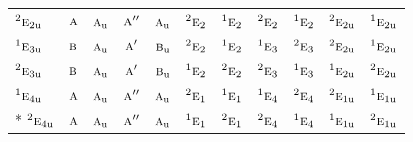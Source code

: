\documentclass[10pt,a4paper]{article}
\numberwithin{equation}{section}
\newcommand{\irr}[1]{\text{\normalfont\scshape #1}}
\newcommand{\conjpair}[1]{{}^{#1}}
\newcommand{\ptag}[1]{\mathrm{#1}}
\begin{document}
{\begin{longtable}{@{}lcccccccccc@{}}
$\conjpair{2}\irr{e}_{2\ptag{u}}$ & $\irr{a}$ & $\irr{a}_{\ptag{u}}$ & $\irr{a}''$ & $\irr{a}_{\ptag{u}}$ & $\conjpair{2}\irr{e}_{2}$ & $\conjpair{1}\irr{e}_{2}$ & $\conjpair{2}\irr{e}_{2}$ & $\conjpair{1}\irr{e}_{2}$ & $\conjpair{2}\irr{e}_{2\ptag{u}}$ & $\conjpair{1}\irr{e}_{2\ptag{u}}$\\
$\conjpair{1}\irr{e}_{3\ptag{u}}$ & $\irr{b}$ & $\irr{a}_{\ptag{u}}$ & $\irr{a}'$ & $\irr{b}_{\ptag{u}}$ & $\conjpair{2}\irr{e}_{2}$ & $\conjpair{1}\irr{e}_{2}$ & $\conjpair{1}\irr{e}_{3}$ & $\conjpair{2}\irr{e}_{3}$ & $\conjpair{2}\irr{e}_{2\ptag{u}}$ & $\conjpair{1}\irr{e}_{2\ptag{u}}$\\
$\conjpair{2}\irr{e}_{3\ptag{u}}$ & $\irr{b}$ & $\irr{a}_{\ptag{u}}$ & $\irr{a}'$ & $\irr{b}_{\ptag{u}}$ & $\conjpair{1}\irr{e}_{2}$ & $\conjpair{2}\irr{e}_{2}$ & $\conjpair{2}\irr{e}_{3}$ & $\conjpair{1}\irr{e}_{3}$ & $\conjpair{1}\irr{e}_{2\ptag{u}}$ & $\conjpair{2}\irr{e}_{2\ptag{u}}$\\
$\conjpair{1}\irr{e}_{4\ptag{u}}$ & $\irr{a}$ & $\irr{a}_{\ptag{u}}$ & $\irr{a}''$ & $\irr{a}_{\ptag{u}}$ & $\conjpair{2}\irr{e}_{1}$ & $\conjpair{1}\irr{e}_{1}$ & $\conjpair{1}\irr{e}_{4}$ & $\conjpair{2}\irr{e}_{4}$ & $\conjpair{2}\irr{e}_{1\ptag{u}}$ & $\conjpair{1}\irr{e}_{1\ptag{u}}$\\*
$\conjpair{2}\irr{e}_{4\ptag{u}}$ & $\irr{a}$ & $\irr{a}_{\ptag{u}}$ & $\irr{a}''$ & $\irr{a}_{\ptag{u}}$ & $\conjpair{1}\irr{e}_{1}$ & $\conjpair{2}\irr{e}_{1}$ & $\conjpair{2}\irr{e}_{4}$ & $\conjpair{1}\irr{e}_{4}$ & $\conjpair{1}\irr{e}_{1\ptag{u}}$ & $\conjpair{2}\irr{e}_{1\ptag{u}}$\\
\bottomrule\end{longtable}}
\end{document}
